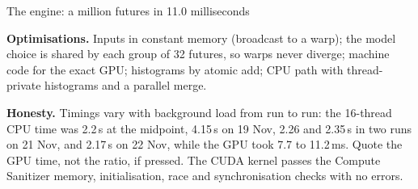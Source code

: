 \documentclass[aspectratio=169,10pt,t]{beamer}
\begin{document}
\begin{frame}[label=s18]{The engine: a million futures in 11.0 milliseconds}
{\textbf{Optimisations.} Inputs in constant memory (broadcast to a warp); the model choice is shared by each group of 32 futures, so warps never diverge; machine code for the exact GPU; histograms by atomic add; CPU path with thread-private histograms and a parallel merge.\par\medskip
\textbf{Honesty.} Timings vary with background load from run to run: the 16-thread CPU time was 2.2\,s at the midpoint, 4.15\,s on 19 Nov, 2.26 and 2.35\,s in two runs on 21 Nov, and 2.17\,s on 22 Nov, while the GPU took 7.7 to 11.2\,ms. Quote the GPU time, not the ratio, if pressed. The CUDA kernel passes the Compute Sanitizer memory, initialisation, race and synchronisation checks with no errors.}
\end{frame}

\end{document}
